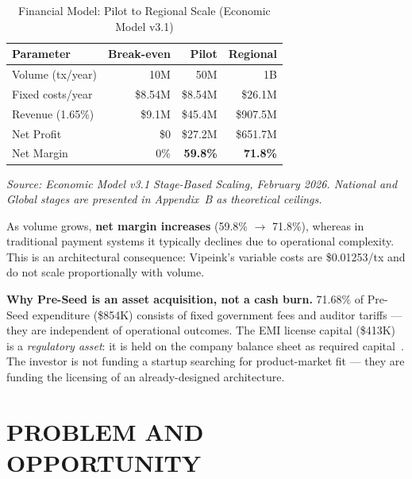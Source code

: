 \documentclass[11pt,a4paper]{article}
\newcommand{\tablesource}[1]{%
\par\vspace{3pt}%
{\footnotesize\color{gray!80}\textit{Source: #1}}%
\par\vspace{2pt}%
}
\begin{document}
\begin{table}[htbp]
\centering
\caption{Financial Model: Pilot to Regional Scale (Economic Model v3.1)}
\small
\begin{tabularx}{\linewidth}{@{}lRRR@{}}
\toprule
\textbf{Parameter} & \textbf{Break-even} & \textbf{Pilot} & \textbf{Regional} \\
\midrule
Volume (tx/year)       & 10M      & 50M       & 1B         \\
Fixed costs/year       & \$8.54M  & \$8.54M   & \$26.1M    \\
Revenue (1.65\%)       & \$9.1M   & \$45.4M   & \$907.5M   \\
Net Profit             & \$0      & \textcolor{okgreen}{\$27.2M} & \textcolor{okgreen}{\$651.7M} \\
Net Margin             & 0\%      & \textcolor{okgreen}{\textbf{59.8\%}} & \textcolor{okgreen}{\textbf{71.8\%}} \\
\bottomrule
\end{tabularx}
\tablesource{Economic Model v3.1 Stage-Based Scaling, February 2026. National and Global stages are presented in Appendix~B as theoretical ceilings.}
\end{table}

\vspace{0.4em}

As volume grows, \textbf{net margin increases} (59.8\% $\to$ 71.8\%), whereas in traditional payment systems it typically declines due to operational complexity. This is an architectural consequence: Vipeink's variable costs are \$0.01253/tx and do not scale proportionally with volume.

\vspace{0.6em}

\begin{tcolorbox}[successbox]
\textbf{Why Pre-Seed is an asset acquisition, not a cash burn.}
71.68\% of Pre-Seed expenditure (\$854K) consists of fixed government fees and auditor tariffs --- they are independent of operational outcomes. The EMI license capital (\$413K) is a \textit{regulatory asset}: it is held on the company balance sheet as required capital~\cite{lb_emi}. The investor is not funding a startup searching for product-market fit --- they are funding the licensing of an already-designed architecture.
\end{tcolorbox}


\FloatBarrier
\section{PROBLEM AND OPPORTUNITY}
\end{document}
